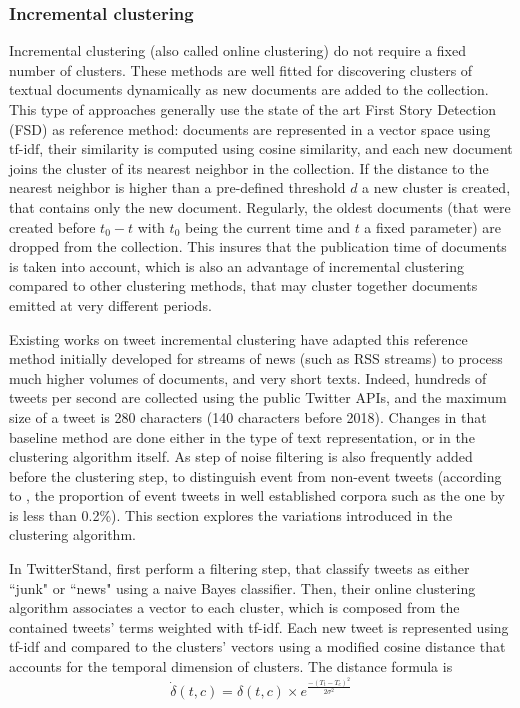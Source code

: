	\subsubsection{Incremental clustering \label{Subsubsec: incremental clustering}} Incremental clustering (also called online clustering) do not require a fixed number of clusters. These methods are well fitted for discovering clusters of textual documents dynamically as new documents are added to the collection.  This type of approaches generally use the state of the art First Story Detection (FSD) \citep{allan_introduction_2002} as reference method: documents are represented in a vector space using $\mbox{tf-idf}$, their similarity is computed using cosine similarity, and each new document joins the cluster of its nearest neighbor in the collection. If the distance to the nearest neighbor is higher than a pre-defined threshold $d$ a new cluster is created, that contains only the new document. Regularly, the oldest documents (that were created before $t_0 - t$ with $t_0$ being the current time and $t$ a fixed parameter) are dropped from the collection. This insures that the publication time of documents is taken into account, which is also an advantage of incremental clustering compared to other clustering methods, that may cluster together documents emitted at very different periods.

Existing works on tweet incremental clustering have adapted this reference method initially developed for streams of news (such as RSS streams) to process much higher volumes of documents, and very short texts. Indeed, hundreds of tweets per second are collected using the public Twitter APIs, and the maximum size of a tweet is 280 characters (140 characters before 2018). Changes in that baseline method are done either in the type of text representation, or in the clustering algorithm itself. As step of noise filtering is also frequently added before the clustering step, to distinguish event from non-event tweets (according to \citet{liu_reuters_2016}, the proportion of event tweets in well established corpora such as the one by \citet{mcminn_building_2013} is less than 0.2\%). This section explores the variations introduced in the clustering algorithm.


In TwitterStand, \citet{sankaranarayanan_twitterstand:_2009} first perform a filtering step, that classify tweets as either ``junk" or ``news" using a naive Bayes classifier. Then, their online clustering algorithm associates a vector to each cluster, which is composed from the contained tweets' terms weighted with tf-idf. Each new tweet is represented using tf-idf and compared to the clusters' vectors using a modified cosine distance that accounts for the temporal dimension of clusters. The distance formula is 
$$
\dot{\delta}(t,c) = \delta(t,c)\times e^{\frac{-(T_t-T_c)^2}{2\sigma^2}}
$$

